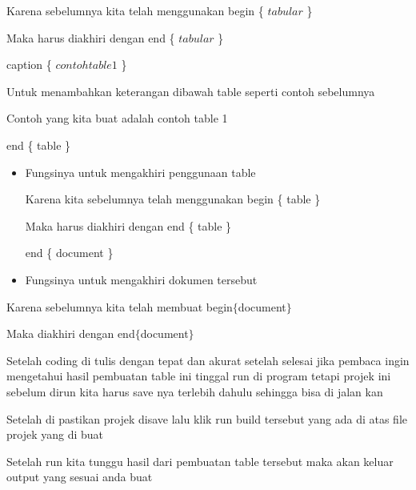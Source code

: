 \noindent Karena sebelumnya kita telah menggunakan begin \{ $tabular$ \} \par


\noindent Maka harus diakhiri dengan end \{ $tabular$ \} \par


\noindent caption \{ $contoh table 1$ \} \par


\noindent Untuk menambahkan keterangan dibawah table seperti contoh sebelumnya\par

Contoh yang kita buat adalah contoh table 1\par


\noindent end \{ table \} \par

\begin{itemize}
	\item Fungsinya untuk mengakhiri penggunaan table\par

Karena kita sebelumnya telah menggunakan begin \{ table \} \par

Maka harus diakhiri dengan end \{ table \} \par

end \{ document \} \par

	\item Fungsinya untuk mengakhiri dokumen tersebut 
\end{itemize}\par


\noindent Karena sebelumnya kita telah membuat begin$ \{ $document$ \} $\par


\noindent Maka diakhiri dengan end$ \{ $document$ \} $\par

Setelah coding di tulis dengan tepat dan akurat setelah selesai jika pembaca ingin mengetahui hasil pembuatan table ini tinggal run di program tetapi projek ini sebelum dirun kita harus save nya terlebih dahulu sehingga bisa di jalan kan \par

Setelah di pastikan projek disave lalu klik run build tersebut yang ada di atas file projek yang di buat\par

Setelah run kita tunggu hasil dari pembuatan table tersebut maka akan keluar output yang sesuai anda buat \par

